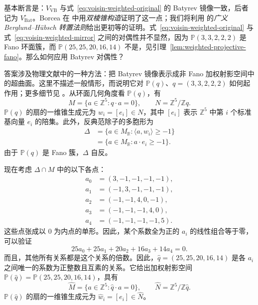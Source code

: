 基本断言是：$V_{\mathrm{VB}}^\circ$ 与式~\eqref{eq:voisin-weighted-original} 的 Batyrev 镜像一致，后者记为 $V_{\mathrm{Bat}}^\circ$。Borcea 在  中用\emph{双棱锥构造}证明了这一点；我们将利用  的\emph{广义 Berglund--Hübsch 转置法则}给出更初等的证明。式~\eqref{eq:voisin-weighted-original} 与式~\eqref{eq:voisin-weighted-mirror} 之间的对偶性并不显然，因为 $\mathbb P(3,3,2,2,2)$ 是 Fano 环面簇，而 $\mathbb P(25,25,20,16,14)$ 不是，见引理~\ref{lem:weighted-projective-fano}。那么如何应用 Batyrev 对偶性？

答案涉及物理文献中的一种方法：把 Batyrev 镜像表示成非 Fano 加权射影空间中的超曲面。这里不描述一般情形，而说明它对 $\mathbb P(q)$、$q=(3,3,2,2,2)$ 如何起作用；更多细节见 。从环面几何角度看 $\mathbb P(q)$，有
\[
M=\{a\in\mathbb Z^5:q\cdot a=0\},\qquad
N=\mathbb Z^5/\mathbb Z q.
\]
$\mathbb P(q)$ 的扇的一维锥生成元为 $w_i=[e_i]\in N$，其中 $[e_i]$ 表示 $\mathbb Z^5$ 中第 $i$ 个标准基向量 $e_i$ 的陪集。此外，反典范除子的多胞形为
\[
\begin{aligned}
\Delta&=\{a\in M_{\mathbb R}:\langle a,w_i\rangle\geq-1\}\\
&=\{a\in M_{\mathbb R}:a\cdot e_i\geq-1\}.
\end{aligned}
\]
由于 $\mathbb P(q)$ 是 Fano 簇，$\Delta$ 自反。

现在考虑 $\Delta\cap M$ 中的以下各点：
\begin{equation}\label{eq:voisin-exponent-rows}
\begin{aligned}
a_0&=(3,-1,-1,-1,-1),\\
a_1&=(-1,3,-1,-1,-1),\\
a_2&=(-1,-1,4,0,-1),\\
a_3&=(-1,-1,-1,4,0),\\
a_4&=(-1,-1,-1,-1,5).
\end{aligned}
\end{equation}
这些点张成以 $0$ 为内点的单形。因此，某个系数全为正的 $a_i$ 的线性组合等于零，可以验证
\begin{equation}\label{eq:voisin-dual-weights}
25a_0+25a_1+20a_2+16a_3+14a_4=0.
\end{equation}
而且，其他所有关系都是这个关系的倍数。因此，$\widehat q=(25,25,20,16,14)$ 是各 $a_i$ 之间唯一的系数为正整数且互素的关系。它给出加权射影空间 $\mathbb P(\widehat q)=\mathbb P(25,25,20,16,14)$，具有
\[
\widehat M=\{a\in\mathbb Z^5:\widehat q\cdot a=0\},\qquad
\widehat N=\mathbb Z^5/\mathbb Z\widehat q.
\]
$\mathbb P(\widehat q)$ 的扇的一维锥生成元为 $\widehat w_i=[e_i]\in\widehat N$。


